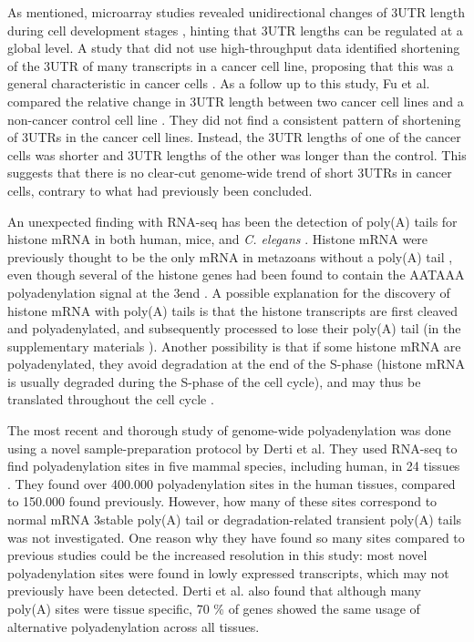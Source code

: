 As mentioned, microarray studies revealed unidirectional changes of 3\p UTR
length during cell development stages \cite{sandberg_proliferating_2008,
ji_progressive_2009}, hinting that 3\p UTR lengths can be regulated at a global
level. A study that did not use high-throughput data identified shortening of
the 3\p UTR of many transcripts in a cancer cell line, proposing that this was
a general characteristic in cancer cells \cite{mayr_widespread_2009}. As a
follow up to this study, Fu et al. compared the relative change in 3\p UTR
length between two cancer cell lines and a non-cancer control cell line
\cite{fu_differential_2011}. They did not find a consistent pattern of
shortening of 3\p UTRs in the cancer cell lines. Instead, the 3\p UTR lengths
of one of the cancer cells was shorter and 3\p UTR lengths of the other was
longer than the control. This suggests that there is no clear-cut genome-wide
trend of short 3\p UTRs in cancer cells, contrary to what had previously been
concluded.

An unexpected finding with RNA-seq has been the detection of poly(A) tails for
histone mRNA in both human, mice, and \textit{C. elegans}
\cite{mangone_landscape_2010, shepard_complex_2011}.  Histone mRNA were
previously thought to be the only mRNA in metazoans without a poly(A) tail
\cite{marzluff_metabolism_2008}, even though several of the histone genes had
been found to contain the AATAAA polyadenylation signal at the 3\p end
\cite{keall_histone_2007}. A possible explanation for the discovery of histone
mRNA with poly(A) tails is that the histone transcripts are first cleaved and
polyadenylated, and subsequently processed to lose their poly(A) tail
\cite{mangone_landscape_2010} (in the supplementary materials
\cite{mangone_landscape_2010}). Another possibility is that if some histone
mRNA are polyadenylated, they avoid degradation at the end of the S-phase
(histone mRNA is usually degraded during the S-phase of the cell cycle), and
may thus be translated throughout the cell cycle \cite{shepard_complex_2011}.

The most recent and thorough study of genome-wide polyadenylation was done
using a novel sample-preparation protocol by Derti et al. They used RNA-seq to
find polyadenylation sites in five mammal species, including human, in 24
tissues \cite{derti_quantitative_2012}. They found over 400.000 polyadenylation
sites in the human tissues, compared to 150.000 found previously. However, how
many of these sites correspond to normal mRNA 3\p stable poly(A) tail or
degradation-related transient poly(A) tails was not investigated. One reason
why they have found so many sites compared to previous studies could be the
increased resolution in this study: most novel polyadenylation sites were found
in lowly expressed transcripts, which may not previously have been detected.
Derti et al. also found that although many poly(A) sites were tissue specific,
70 \% of genes showed the same usage of alternative polyadenylation across all
tissues.
